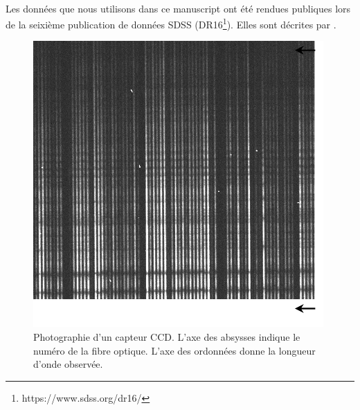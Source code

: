\documentclass[11pt, twoside, a4paper, openright]{report}
\begin{document}
\paragraph{}
Les données que nous utilisons dans ce manuscript ont été rendues publiques lors de la seixième publication de données SDSS (DR16\footnote{https://www.sdss.org/dr16/}). Elles sont décrites par \citet{Ahumada2019}.
\begin{figure}[b]
  \centering
  \includegraphics[scale=0.8]{photo_ccd.pdf}
  \caption{Photographie d'un capteur CCD. L'axe des absysses indique le numéro de la fibre optique. L'axe des ordonnées donne la longueur d'onde observée.}
  \label{fig:photo_ccd}
\end{figure}
\end{document}
